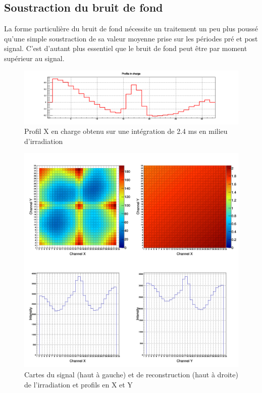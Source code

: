 \documentclass[a4paper,11pt]{article}
\begin{document}
\subsection*{Soustraction du bruit de fond}
La forme particulière du bruit de fond nécessite un traitement un peu plus poussé qu’une simple soustraction de sa valeur moyenne prise sur les périodes pré et post signal.
C’est d’autant plus essentiel que le bruit de fond peut être par moment supérieur au signal.
\begin{figure}[h]
\begin{center}
\includegraphics[scale=0.4]{SFB_396p.png} 
\caption{\label{fig:396p}\footnotesize{Profil X en charge obtenu sur une intégration de 2.4 ms en milieu d’irradiation}}
\end{center}
\end{figure}

\begin{figure}[h]
\begin{center}
\includegraphics[scale=0.4]{Imagep.png} 
\caption{\label{fig:imagep}\footnotesize{Cartes du signal (haut à gauche) et de reconstruction (haut à droite) de l’irradiation et profils en X et Y}}
\end{center}
\end{figure}
\end{document}
